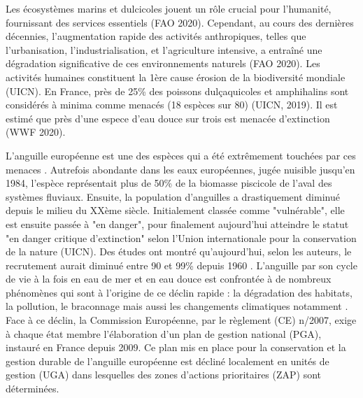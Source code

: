 \documentclass[11pt,titlepage,twoside]{article}\usepackage[]{graphicx}\usepackage[table]{xcolor}
\begin{document}
Les écosystèmes marins et dulcicoles jouent un rôle crucial pour l’humanité, fournissant des services essentiels (FAO 2020).
Cependant, au cours des dernières décennies, l'augmentation rapide des activités anthropiques, telles que l'urbanisation, l'industrialisation, et l'agriculture intensive, a entraîné une dégradation significative de ces environnements naturels (FAO 2020).
Les activités humaines constituent la 1ère cause érosion de la biodiversité mondiale (UICN).
En France, près de 25\% des poissons dulçaquicoles et amphihalins sont considérés à minima comme menacés (18 espèces sur 80) (UICN, 2019).
Il est estimé que près d’une espece d’eau douce sur trois est menacée d’extinction (WWF 2020).

L’anguille européenne est une des espèces qui a été extrêmement touchées par ces menaces \citep{dekker_climbing_2016}. Autrefois abondante dans les eaux européennes, jugée nuisible jusqu’en 1984, l’espèce représentait plus de 50\% de la biomasse piscicole de l’aval des systèmes fluviaux.
Ensuite, la population d'anguilles a drastiquement diminué depuis le milieu du XXème siècle. Initialement classée comme "vulnérable", elle est ensuite passée à "en danger", pour finalement aujourd’hui atteindre le statut "en danger critique d'extinction" selon l'Union internationale pour la conservation de la nature (UICN). Des études ont montré qu’aujourd’hui, selon les auteurs, le recrutement aurait diminué entre 90 et 99\% depuis 1960 \citep{feunteun_review_2003-1,baisez_outil_2005}.
L’anguille par son cycle de vie à la fois en eau de mer et en eau douce est confrontée à de nombreux phénomènes
qui sont à l’origine de ce déclin rapide : la dégradation des habitats, la pollution, le braconnage mais aussi les
changements climatiques notamment \citep{dekker_worldwide_2003}.
Face à ce déclin, la Commission Européenne, par le règlement (CE) n/2007, exige à chaque état membre l'élaboration d'un plan de gestion national (PGA), instauré en France depuis 2009.
Ce plan mis en place pour la conservation et la gestion durable de l'anguille européenne est décliné localement en unités de gestion (UGA) dans lesquelles des zones d'actions prioritaires (ZAP) sont déterminées.
\end{document}
